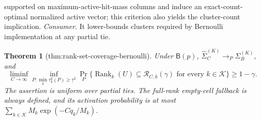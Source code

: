 \documentclass{article}
\newtheorem{theorem}{Theorem}
\begin{document}
supported on maximum-active-hit-mass columns and induce an exact-count-optimal normalized active vector; this criterion also yields the cluster-count implication. \textit{Consumer.} It lower-bounds clusters required by Bernoulli implementation at any partial tie.

\begin{theorem}[thm:rank-set-coverage-bernoulli]\label{thm:rank-set-coverage-bernoulli}
Under \(\mathsf B(p)\), \(\widehat\Sigma_C^{(K)}\to_P\Sigma_B^{(K)}\), and \[\liminf_{C\to\infty}\inf_{P:\min_k\tau_k^2(P)\geq\underline\tau^2}\Pr_P\{\operatorname{Rank}_k(U)\subseteq\mathcal R_{C,k}(\gamma)\text{ for every }k\in\mathcal K\}\geq1-\gamma.\] The assertion is uniform over partial ties. The full-rank empty-cell fallback is always defined, and its activation probability is at most \(\sum_{k\in\mathcal K}M_k\exp(-Cq_k/M_k)\).
\end{theorem}
\end{document}
